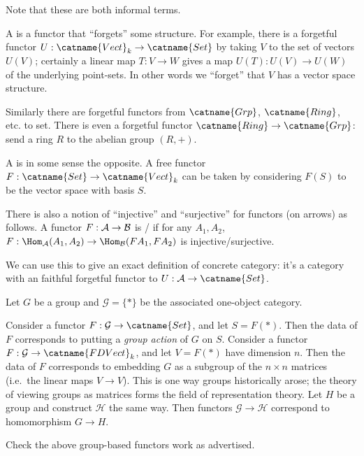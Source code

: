 \documentclass[11pt]{scrreprt}
\begin{document}
\begin{example}
	Note that these are both informal terms.
	\begin{enumerate}[(a)]
		\ii A  is a functor that ``forgets'' some structure.
		For example, there is a forgetful functor $U : \catname{Vect}_k \to \catname{Set}$
		by taking $V$ to the set of vectors $U(V)$; certainly a linear map $T : V \to W$
		gives a map $U(T) : U(V) \to U(W)$ of the underlying point-sets.
		In other words we ``forget'' that $V$ has a vector space structure.

		Similarly there are forgetful functors from $\catname{Grp}$, $\catname{Ring}$, etc. to set.
		There is even a forgetful functor $\catname{Ring} \to \catname{Grp}$: send a ring $R$
		to the abelian group $(R,+)$.

		\ii A  is in some sense the opposite.
		A free functor $F : \catname{Set} \to \catname{Vect}_k$ can be taken by considering
		$F(S)$ to be the vector space with basis $S$.
	\end{enumerate}
\end{example}
\begin{remark}
	There is also a notion of ``injective'' and ``surjective'' for functors (on arrows) as follows.
	A functor $F : \mathcal A \to \mathcal B$ is / if for any $A_1, A_2$,
	$F : \Hom_\AA(A_1, A_2) \to \Hom_\BB(FA_1, FA_2)$ is injective/surjective.

	We can use this to give an exact definition of concrete category:
	it's a category with an faithful forgetful functor to $U: \AA \to \catname{Set}$.
\end{remark}

\begin{example}
	Let $G$ be a group and $\mathcal G = \{\ast\}$ be the associated one-object category.
	\begin{enumerate}[(a)]
		\ii Consider a functor $F : \mathcal G \to \catname{Set}$, and let $S = F(\ast)$.
		Then the data of $F$ corresponds to putting a \emph{group action} of $G$ on $S$.
		\ii Consider a functor $F : \mathcal G \to \catname{FDVect}_k$, and let $V = F(\ast)$ have dimension $n$.
		Then the data of $F$ corresponds to embedding $G$ as a subgroup of the $n \times n$ matrices
		(i.e.\ the linear maps $V \to V$).
		This is one way groups historically arose; the theory of viewing groups as matrices
		forms the field of representation theory.
		\ii Let $H$ be a group and construct $\mathcal H$ the same way.
		Then functors $\mathcal G \to \mathcal H$ correspond to homomorphism $G \to H$.
	\end{enumerate}
\end{example}
\begin{exercise}
	Check the above group-based functors work as advertised.
\end{exercise}
\end{document}
